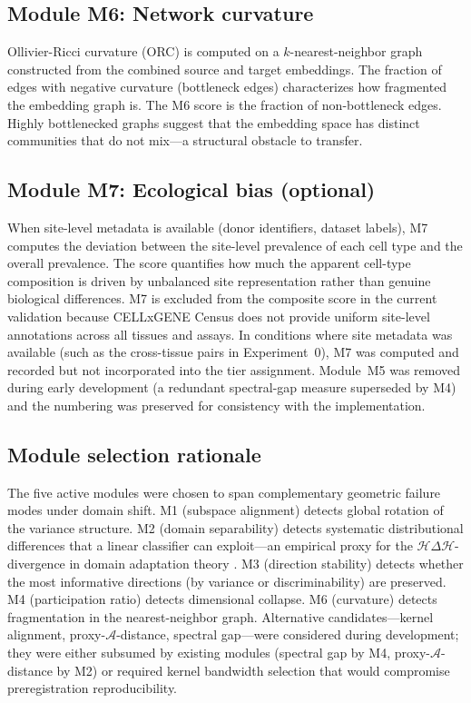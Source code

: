 \documentclass[11pt,letterpaper]{article}
\begin{document}
\subsection{Module M6: Network curvature}

Ollivier-Ricci curvature (ORC) is computed on a $k$-nearest-neighbor graph constructed from the combined source and target embeddings. The fraction of edges with negative curvature (bottleneck edges) characterizes how fragmented the embedding graph is. The M6 score is the fraction of non-bottleneck edges. Highly bottlenecked graphs suggest that the embedding space has distinct communities that do not mix---a structural obstacle to transfer.

\subsection{Module M7: Ecological bias (optional)}

When site-level metadata is available (donor identifiers, dataset labels), M7 computes the deviation between the site-level prevalence of each cell type and the overall prevalence. The score quantifies how much the apparent cell-type composition is driven by unbalanced site representation rather than genuine biological differences. M7 is excluded from the composite score in the current validation because CELLxGENE Census does not provide uniform site-level annotations across all tissues and assays. In conditions where site metadata was available (such as the cross-tissue pairs in Experiment~0), M7 was computed and recorded but not incorporated into the tier assignment. Module~M5 was removed during early development (a redundant spectral-gap measure superseded by M4) and the numbering was preserved for consistency with the implementation.

\subsection{Module selection rationale}

The five active modules were chosen to span complementary geometric failure modes under domain shift. M1 (subspace alignment) detects global rotation of the variance structure. M2 (domain separability) detects systematic distributional differences that a linear classifier can exploit---an empirical proxy for the $\mathcal{H}\Delta\mathcal{H}$-divergence in domain adaptation theory \citep{bendavid2010domain}. M3 (direction stability) detects whether the most informative directions (by variance or discriminability) are preserved. M4 (participation ratio) detects dimensional collapse. M6 (curvature) detects fragmentation in the nearest-neighbor graph. Alternative candidates---kernel alignment, proxy-$\mathcal{A}$-distance, spectral gap---were considered during development; they were either subsumed by existing modules (spectral gap by M4, proxy-$\mathcal{A}$-distance by M2) or required kernel bandwidth selection that would compromise preregistration reproducibility.
\end{document}
